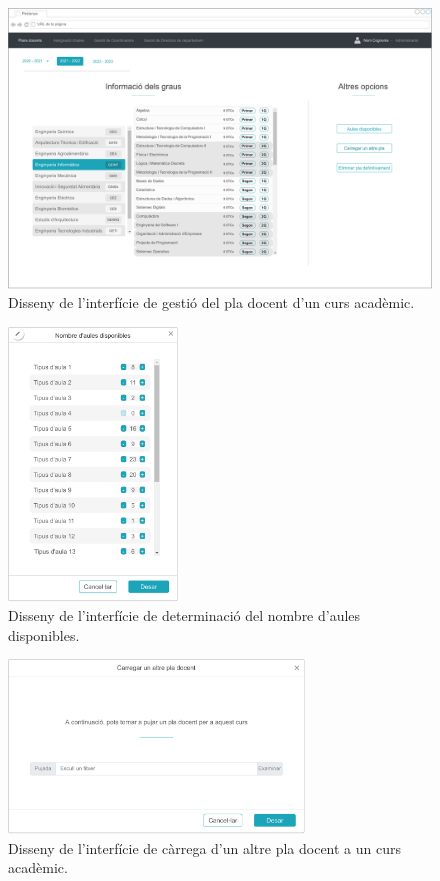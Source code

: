 \documentclass[a4paper,12pt]{ThesisStyle}
\begin{document}
\begin{figure}[H]
	\centering
	\includegraphics[width=\textwidth]{assets/interfaces/administradors/plansDocents/mainCarregat.pdf}
	\caption{\label{img:plansDocents_mainCarregat}Disseny de l'interfície de gestió del pla docent d'un curs acadèmic.}
\end{figure}

\begin{figure}[H]
	\centering
	\includegraphics[width=0.4\textwidth]{assets/interfaces/administradors/plansDocents/aulesDialog.pdf}
	\caption{\label{img:plansDocents_aulesDialog}Disseny de l'interfície de determinació del nombre d'aules disponibles.}
\end{figure}

\begin{figure}[H]
	\centering
	\includegraphics[width=0.7\textwidth]{assets/interfaces/administradors/plansDocents/carregarDialog.pdf}
	\caption{\label{img:plansDocents_carregarDialog}Disseny de l'interfície de càrrega d'un altre pla docent a un curs acadèmic.}
\end{figure}
\end{document}
